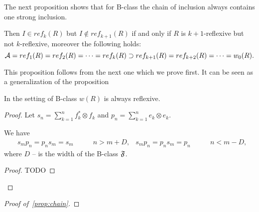 \documentclass[12pt]{amsart}
\theoremstyle{case}
\begin{document}
  The next proposition shows that for B-class the chain of inclusion always contains one strong inclusion.
  \begin{prop}
    \label{prop:chain}
    Then $I \in ref_k(R)$ but $I \not\in ref_{k+1}(R)$ if and only if $R$ is $k + 1$-reflexive but not $k$-reflexive, moreover the
      following holds:
    \[
      \cal{A} = ref_1(R) = ref_2(R) = \dots = ref_k(R) \supset ref_{k + 1}(R) = ref_{k + 2}(R) = \dots = w_0(R).
    \]
  \end{prop}
  This proposition follows from the next one which we prove first.
  It can be seen as a generalization of the proposition
  \begin{prop}
    In the setting of B-class $w(R)$ is always reflexive.
  \end{prop}
  \begin{proof}
    Let $s_n = \sum_{k=1}^n f^*_k \otimes f_k$ and $p_n = \sum_{k=1}^n e_k \otimes e_k$.
    \begin{lemma}
      We have 
      \begin{align*}
        &s_m p_n = p_n s_m = s_m \qquad & n > m + D,
        &s_m p_n = p_n s_m = p_n \qquad & n < m - D,
      \end{align*}
      where $D$ -- is the width of the B-class $\fsys$.
    \end{lemma}
    \begin{proof}
      TODO
    \end{proof}
    \begin{lemma}
    \end{lemma}
  \end{proof}

  \begin{proof}[Proof of~\ref{prop:chain}]
  \end{proof}


\end{document}
